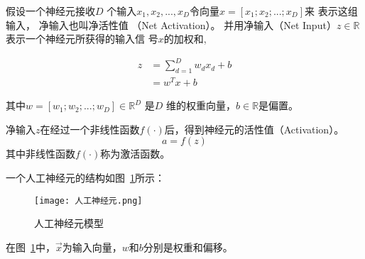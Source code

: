 假设一个神经元接收$𝐷$ 个输入$x_1,x_2,...,x_D$令向量$x=[x_1;x_2;...;x_D]$来
表示这组输入， 净输入也叫净活性值
（Net Activation）。
并用净输入（Net Input）$z\in \mathbb{R}$表示一个神经元所获得的输入信
号$x$的加权和,

\begin{equation}
\begin{aligned}    
    z &= \sum_{d=1}^D w_d x_d + b \\
      &= w^Tx + b        
\end{aligned}    
\end{equation}

其中$w=[w_1;w_2;...;w_D] \in \mathbb{R}^D$ 是$𝐷$ 维的权重向量，$b\in \mathbb{R}$是偏置。


净输入$𝑧$在经过一个非线性函数$f(\cdot)$后，得到神经元的活性值（Activation）。
\begin{equation}
    a = f(z)
\end{equation}
其中非线性函数$f(\cdot)$称为激活函数。

一个人工神经元的结构如图~\ref{fig:神经元}所示：
\begin{figure}
    \centering
    \texttt{[image: 人工神经元.png]}
    \caption{人工神经元模型}
    \label{fig:神经元}
  \end{figure}

在图~\ref{fig:神经元}中，$\vec{x}$为输入向量，$w$和$b$分别是权重和偏移。

